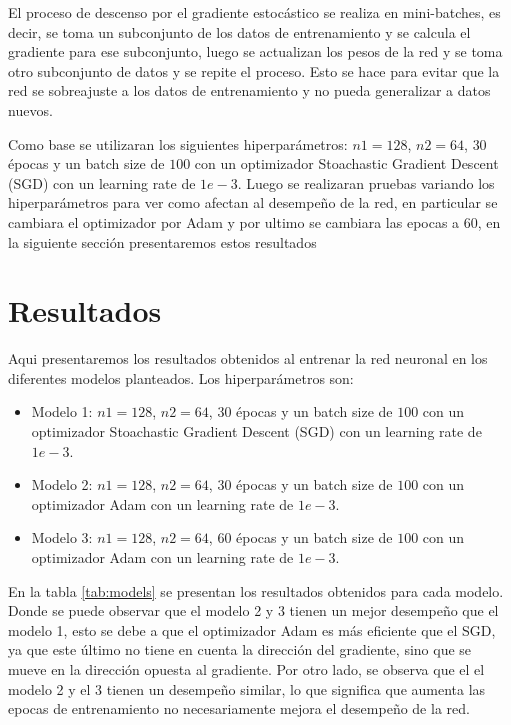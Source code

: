 \documentclass[aps,prl,reprint,groupedaddress]{revtex4-2}
\begin{document}
El proceso de descenso por el gradiente estocástico se realiza en mini-batches,
es decir, se toma un subconjunto de los datos de entrenamiento y se calcula el
gradiente para ese subconjunto, luego se actualizan los pesos de la red y se
toma otro subconjunto de datos y se repite el proceso. Esto se hace para evitar
que la red se sobreajuste a los datos de entrenamiento y no pueda generalizar
a datos nuevos.

Como base se utilizaran los siguientes hiperparámetros: $n1=128$, $n2=64$, 
$30$ épocas y un batch size de $100$ con un optimizador 
Stoachastic Gradient Descent (SGD) con un learning rate de $1e-3$. Luego se 
realizaran pruebas variando los hiperparámetros para ver como afectan al 
desempeño de la red, en particular se cambiara el optimizador por Adam y 
por ultimo se cambiara las epocas a $60$, en la siguiente sección presentaremos
estos resultados

\section{Resultados}

Aqui presentaremos los resultados obtenidos al entrenar la red neuronal en los 
diferentes modelos planteados. Los hiperparámetros son:

\begin{itemize}
  \item Modelo 1: $n1=128$, $n2=64$, $30$ épocas y un batch size de $100$ con un
  optimizador Stoachastic Gradient Descent (SGD) con un learning rate de $1e-3$.
  \item Modelo 2: $n1=128$, $n2=64$, $30$ épocas y un batch size de $100$ con un
  optimizador Adam con un learning rate de $1e-3$.
  \item Modelo 3: $n1=128$, $n2=64$, $60$ épocas y un batch size de $100$ con un
  optimizador Adam con un learning rate de $1e-3$.
\end{itemize}

En la tabla \ref{tab:models} se presentan los resultados obtenidos para cada
modelo. Donde se puede observar que el modelo 2 y 3 tienen un mejor desempeño
que el modelo 1, esto se debe a que el optimizador Adam es más eficiente que el
SGD, ya que este último no tiene en cuenta la dirección del gradiente, sino que
se mueve en la dirección opuesta al gradiente. Por otro lado, se observa que el
el modelo 2 y el 3 tienen un desempeño similar, lo que significa que aumenta 
las epocas de entrenamiento no necesariamente mejora el desempeño de la red.
\end{document}
